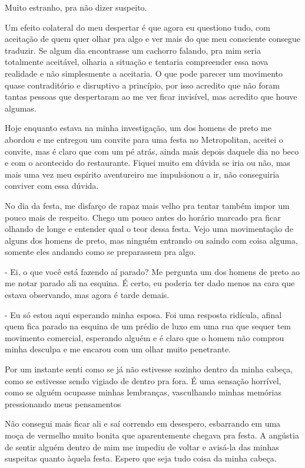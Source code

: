 Muito estranho, pra não dizer suspeito.

Um efeito colateral do meu despertar é que agora eu questiono tudo, com aceitação de quem quer olhar pra algo e ver mais do que meu consciente consegue traduzir. Se algum dia encontrasse um cachorro falando, pra mim seria totalmente aceitável, olharia a situação e tentaria compreender essa nova realidade e não simplesmente a aceitaria. O que pode parecer um movimento quase contraditório e disruptivo a princípio, por isso acredito que não foram tantas pessoas que despertaram ao me ver ficar invisível, mas acredito que houve algumas.

Hoje enquanto estava na minha investigação, um dos homens de preto me abordou e me entregou um convite para uma festa no Metropolitan, aceitei o convite, mas é claro que com um pé atrás, ainda mais depois daquele dia no beco e com o acontecido do restaurante. Fiquei muito em dúvida se iria ou não, mas mais uma vez meu espírito aventureiro me impulsionou a ir, não conseguiria conviver com essa dúvida.

No dia da festa, me disfarço de rapaz mais velho pra tentar também impor um pouco mais de respeito. Chego um pouco antes do horário marcado pra ficar olhando de longe e entender qual o teor dessa festa. Vejo uma movimentação de alguns dos homens de preto, mas ninguém entrando ou saindo com coisa alguma, somente eles andando como se preparassem pra algo.

- Ei, o que você está fazendo aí parado? Me pergunta um dos homens de preto ao me notar parado ali na esquina. É certo, eu poderia ter dado menos na cara que estava observando, mas agora é tarde demais.

- Eu só estou aqui esperando minha esposa. Foi uma resposta ridícula, afinal quem fica parado na esquina de um prédio de luxo em uma rua que sequer tem movimento comercial, esperando alguém e é claro que o homem não comprou minha desculpa e me encarou com um olhar muito penetrante.

Por um instante senti como se já não estivesse sozinho dentro da minha cabeça, como se estivesse sendo vigiado de dentro pra fora. É uma sensação horrível, como se alguém ocupasse minhas lembranças, vasculhando minhas memórias pressionando meus pensamentos

Não consegui mais ficar ali e saí correndo em desespero, esbarrando em uma moça de vermelho muito bonita que aparentemente chegava pra festa. A angústia de sentir alguém dentro de mim me impediu de voltar e avisá-la das minhas suspeitas quanto àquela festa. Espero que seja tudo coisa da minha cabeça.

